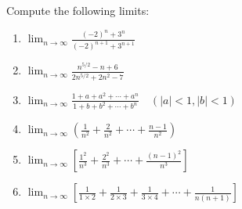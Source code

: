 \begin{exercise}
Compute the following limits:
\begin{enumerate}
    \item $\lim_{n \to \infty} \frac{(-2)^n + 3^n}{(-2)^{n+1} + 3^{n+1}}$
    \item $\lim_{n \to \infty} \frac{n^{5/2} - n + 6}{2n^{5/2} + 2n^2 - 7}$
    \item $\lim_{n \to \infty} \frac{1 + a + a^2 + \cdots + a^n}{1 + b + b^2 + \cdots + b^n} \quad (|a|<1, |b|<1)$
    \item $\lim_{n \to \infty} \left( \frac{1}{n^2} + \frac{2}{n^2} + \cdots + \frac{n-1}{n^2} \right)$
    \item $\lim_{n \to \infty} \left[ \frac{1^2}{n^3} + \frac{2^2}{n^3} + \cdots + \frac{(n-1)^2}{n^3} \right]$
    \item $\lim_{n \to \infty} \left[ \frac{1}{1 \times 2} + \frac{1}{2 \times 3} + \frac{1}{3 \times 4} + \cdots + \frac{1}{n(n+1)} \right]$
\end{enumerate}
\end{exercise}
